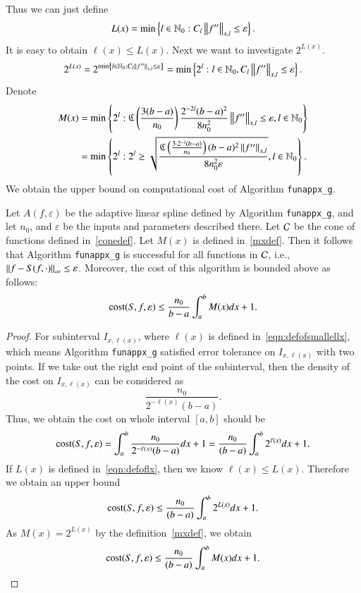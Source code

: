 Thus we can just define
\begin{equation}\label{eqn:defoflx}
L(x) = \min \left\{ l \in \natzero : C_l \norm[x,l]{f''} \le \varepsilon\right\} .
\end{equation}
It is easy to obtain $\ell(x) \le L(x)$.
Next we want to investigate $2^{L(x)}$.
$$
2^{L(x)}=2^{\min \left\{ l \in \natzero : C_l \norm[x,l]{f''}\le \varepsilon\right\}} = \min\left\{2^l: l \in  \natzero, C_l \norm[x,l]{f''}\le \varepsilon\right\}.$$
Denote
\begin{align}\label{mxdef}
M(x) & = \min\left\{2^l:  \fC\left(\frac{3(b-a)}{n_0}\right) \frac{2^{-2l}(b-a)^2}{8n^2_0}\norm[x,l]{f''} \le \varepsilon,  l \in  \natzero\right\}\nonumber \\
 & = \min\left\{2^l:  2^l \ge \sqrt{\frac{\fC\left(\frac{3 \cdot 2^{-l}(b-a)}{n_0}\right)  (b-a)^2 \norm[x,l]{f''}}{8n^2_0\varepsilon}},  l \in  \natzero\right\}.
\end{align}
We obtain the upper bound on computational cost of Algorithm \texttt{funappx\_g}.

\begin{theorem}\label{thm:cost}
Let $A(f,\varepsilon)$ be the adaptive linear spline defined by Algorithm \textnormal{\texttt{funappx\_g}}, and let $n_0$, and $\varepsilon$ be the inputs and parameters described there. Let $\cc$ be the cone of functions defined in~\eqref{conedef}.
Let $M(x)$ is defined in~\eqref{mxdef}.
Then it follows that Algorithm \textnormal{\texttt{funappx\_g}} is successful for all functions in $\cc$,  i.e.,  $\norm[\infty]{f - S(f, \cdot)} \le \varepsilon$.  Moreover, the cost of this algorithm is bounded above as follows:
$$\cost(S,f,\varepsilon) \le \frac{n_0}{b-a}\int_a^b M(x) dx +1.$$
\end{theorem}

\begin{proof}
For subinterval $I_{x,\ell(x)}$, where $\ell(x)$ is defined in~\eqref{eqn:defofsmallellx},
which means Algorithm \texttt{funappx\_g} satisfied error tolerance on $I_{x,\ell(x)}$ with two points.
If we take out the right end point of the subinterval, then the density of the cost on $I_{x,\ell(x)}$ can be considered as
$$\frac{n_0}{2^{-\ell(x)}(b-a)}.$$
Thus, we obtain the cost on whole interval $[a,b]$ should be
$$\cost(S,f,\varepsilon)  = \int_a^b \frac{n_0}{2^{-\ell(x)}(b-a)}dx +1= \frac{n_0}{(b-a)}\int_a^b 2^{\ell(x)}dx +1.
$$
If $L(x)$ is defined in~\eqref{eqn:defoflx}, then we know $\ell(x) \le L(x)$. Therefore we obtain an upper bound
$$\cost(S,f,\varepsilon)  \le \frac{n_0}{(b-a)}\int_a^b 2^{L(x)}dx +1.
$$
As $M(x)=2^{L(x)}$ by the definition~\eqref{mxdef}, we obtain
$$\cost(S,f,\varepsilon)  \le \frac{n_0}{(b-a)}\int_a^b M(x) dx +1.
$$
\end{proof}

